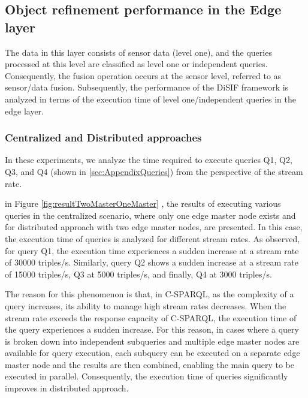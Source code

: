 \documentclass[5p,times]{elsarticle}
\begin{document}
\subsection{Object refinement performance in the Edge layer}


The data in this layer consists of sensor data (level one), and the queries processed at this level are classified as level one or independent queries. 
Consequently, the fusion operation occurs at the sensor level, referred to as sensor/data fusion. Subsequently, the performance of the DiSIF framework is analyzed in terms of the execution time of level one/independent queries in the edge layer.

\subsubsection{Centralized and Distributed approaches}
In these experiments, we analyze the time required to execute queries Q1, Q2, Q3, and Q4
 (shown in \ref{sec:AppendixQueries}) from the perspective of the stream rate.




in Figure \ref{fig:resultTwoMasterOneMaster} , the results of executing various queries in the centralized scenario, where only one edge master node exists and for distributed approach with two edge master nodes,
 are presented. In this case, the execution time of queries is analyzed for different stream rates.
 As observed, for query Q1, the execution time experiences a sudden increase at a stream rate of 30000 triples/s.
 Similarly, query Q2 shows a sudden increase at a stream rate of 15000 triples/s, Q3 at 5000 triples/s, and finally, Q4 at 3000 triples/s. 

The reason for this phenomenon is that, in C-SPARQL, as the complexity of a query increases, its ability to manage high stream rates decreases.
 When the stream rate exceeds the response capacity of C-SPARQL, the execution time of the query experiences a sudden increase.
For this reason, in cases where a query is broken down into independent subqueries and multiple edge master nodes are available for query execution, 
each subquery can be executed on a separate edge master node and the results are then combined, enabling the main query to be executed in parallel. 
Consequently, the execution time of queries significantly improves in distributed approach.
\end{document}
